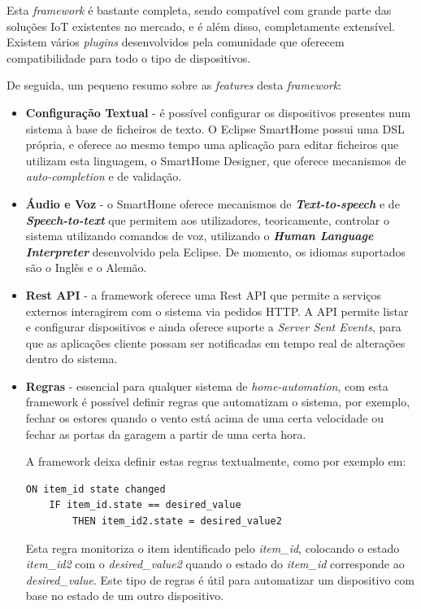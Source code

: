 Esta \textit{framework} é bastante completa, sendo compatível com grande parte das soluções IoT existentes no mercado, e é além disso, completamente extensível. Existem vários \textit{plugins} desenvolvidos pela comunidade que oferecem compatibilidade para todo o tipo de dispositivos.

De seguida, um pequeno resumo sobre as \textit{features} desta \textit{framework}:

\begin{itemize}
\item \textbf{Configuração Textual} - é possível configurar os dispositivos presentes num sistema à base de ficheiros de texto. O Eclipse SmartHome possui uma DSL própria, e oferece ao mesmo tempo uma aplicação para editar ficheiros que utilizam esta linguagem, o SmartHome Designer, que oferece mecanismos de \textit{auto-completion} e de validação.

\item \textbf{Áudio e Voz} - o SmartHome oferece mecanismos de \textbf{\textit{Text-to-speech}} e de \textbf{\textit{Speech-to-text}} que permitem aos utilizadores, teoricamente, controlar o sistema utilizando comandos de voz, utilizando o \textbf{\textit{Human Language Interpreter}} desenvolvido pela Eclipse. De momento, os idiomas suportados são o Inglês e o Alemão.

\item \textbf{Rest API} - a framework oferece uma Rest API que permite a serviços externos interagirem com o sistema via pedidos HTTP. A API permite listar e configurar dispositivos e ainda oferece suporte a \textit{Server Sent Events}\cite{sse}, para que as aplicações cliente possam ser notificadas em tempo real de alterações dentro do sistema.

\item \textbf{Regras} - essencial para qualquer sistema de \textit{home-automation}, com esta framework é possível definir regras que automatizam o sistema, por exemplo, fechar os estores quando o vento está acima de uma certa velocidade ou fechar as portas da garagem a partir de uma certa hora.

A framework deixa definir estas regras textualmente, como por exemplo em:

\begin{Verbatim}
ON item_id state changed
    IF item_id.state == desired_value
        THEN item_id2.state = desired_value2
\end{Verbatim}

Esta regra monitoriza o item identificado pelo \textit{item\_id}, colocando o estado \textit{item\_id2} com o \textit{desired\_value2} quando o estado do \textit{item\_id} corresponde ao \textit{desired\_value}. Este tipo de regras é útil para automatizar um dispositivo com base no estado de um outro dispositivo.


\end{itemize}
